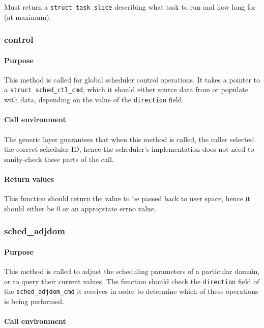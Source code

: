 \documentclass[11pt,twoside,final,openright]{xenstyle}
\begin{document}
Must return a {\tt struct task\_slice} describing what task to run and how long
for (at maximum).

\subsubsection{control}

\paragraph*{Purpose}

This method is called for global scheduler control operations.  It takes a
pointer to a {\tt struct sched\_ctl\_cmd}, which it should either
source data from or populate with data, depending on the value of the
{\tt direction} field.

\paragraph*{Call environment}

The generic layer guarantees that when this method is called, the
caller selected the correct scheduler ID, hence the scheduler's
implementation does not need to sanity-check these parts of the call.

\paragraph*{Return values}

This function should return the value to be passed back to user space, hence it
should either be 0 or an appropriate errno value.

\subsubsection{sched\_adjdom}

\paragraph*{Purpose}

This method is called to adjust the scheduling parameters of a particular
domain, or to query their current values.  The function should check
the {\tt direction} field of the {\tt sched\_adjdom\_cmd} it receives in
order to determine which of these operations is being performed.

\paragraph*{Call environment}
\end{document}
